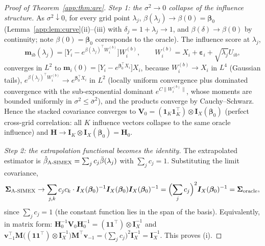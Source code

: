 \documentclass[11pt]{article}
\theoremstyle{plain}
\theoremstyle{definition}
\newcommand{\bet}{\bm{\beta}}
\newcommand{\beps}{\bm{\varepsilon}}
\newcommand{\bSig}{\bm{\Sigma}}
\newcommand{\btH}{\bm{H}}
\newcommand{\bI}{\bm{I}}
\newcommand{\asimex}{\textup{A-SIMEX}}
\begin{document}
\begin{proof}[Proof of Theorem~\ref{app:thm:are}]
\emph{Step 1: the $\sigma^2\to0$ collapse of the influence structure.}
As $\sigma^2\downarrow0$, for every grid point $\lambda_j$,
$\beta(\lambda_j)\to\beta(0)=\bet_0$
(Lemma~\ref{app:lem:curve}(ii)--(iii) with $\delta_j=1+\lambda_j\to1$, and
$\beta(\delta)\to\beta(0)$ by continuity; note $\beta(0)=\bet_0$
corresponds to the oracle). The influence score at $\lambda_j$,
\[
  \bm m_{ib}(\lambda_j)
  =\bigl[Y_i-e^{\beta(\lambda_j)^\top W_i^{(b)}}\bigr]
   W_i^{(b)},\qquad
  W_i^{(b)}=X_i+\beps_i+\sqrt{\lambda_j}U_{ib},
\]
converges in $L^2$ to $\bm m_i(0)=
\bigl[Y_i-e^{\bet_0^\top X_i}\bigr]X_i$, because
$W_i^{(b)}\to X_i$ in $L^4$ (Gaussian tails),
$e^{\beta(\lambda_j)^\top W_i^{(b)}}\to e^{\bet_0^\top X_i}$ in $L^2$
(locally uniform convergence plus dominated convergence with the
sub-exponential dominant $e^{C\|W_i^{(b)}\|}$, whose moments are bounded
uniformly in $\sigma^2\le\bar\sigma^2$), and the products converge by
Cauchy--Schwarz. Hence the stacked covariance converges to
$\bm V_0=(\bm 1_K\bm 1_K^\top)\otimes\bm I_X(\bet_0)$ (perfect
cross-grid correlation: all $K$ influence vectors collapse to the same
oracle influence) and $\btH\to\bI_K\otimes\bm I_X(\bet_0)=\bm H_0$.

\emph{Step 2: the extrapolation functional becomes the identity.} The
extrapolated estimator is
$\hat\beta_{\asimex}=\sum_j c_j\bar\beta(\lambda_j)$ with
$\sum_j c_j=1$. Substituting the limit covariance,
\[
  \bSig_{\asimex}\to
  \sum_{j,k}c_jc_k\cdot\bm I_X(\bet_0)^{-1}
  \bm I_X(\bet_0)\bm I_X(\bet_0)^{-1}
  =\Bigl(\sum_jc_j\Bigr)^2\bm I_X(\bet_0)^{-1}
  =\bSig_{\mathrm{oracle}},
\]
since $\sum_jc_j=1$ (the constant function lies in the span of the
basis). Equivalently, in matrix form:
$\btH_0^{-1}\bm V_0\btH_0^{-1}
=(\bm 1\bm 1^\top)\otimes\bm I_X^{-1}$ and
$\bm v_{-1}^\top\bm M\bigl((\bm 1\bm 1^\top)\otimes\bm I_X^{-1}\bigr)
\bm M^\top\bm v_{-1}=\bigl(\sum_jc_j\bigr)^2\bm I_X^{-1}
=\bm I_X^{-1}$. This proves (i).


\end{proof}
\end{document}
